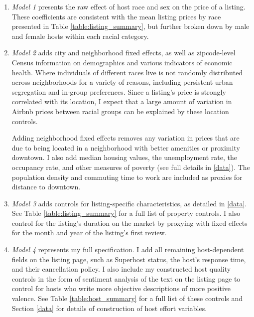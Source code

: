 \begin{enumerate}
	\item \textit{Model 1} presents the raw effect of host race and sex on the price of a listing. These coefficients are consistent with the mean listing prices by race presented in Table \ref{table:listing_summary}, but further broken down by male and female hosts within each racial category.
	
	\item \textit{Model 2} adds city and neighborhood fixed effects, as well as zipcode-level Census information on demographics and various indicators of economic health. Where individuals of different races live is not randomly distributed across neighborhoods for a variety of reasons, including persistent urban segregation  and in-group preferences. Since a listing's price is strongly correlated with its location, I expect that a large amount of variation in Airbnb prices between racial groups can be explained by these location controls. 
	
	Adding neighborhood fixed effects removes any variation in prices that are due to being located in a neighborhood with better amenities or proximity downtown. I also add median housing values, the unemployment rate, the occupancy rate, and other measures of poverty (see full details in \ref{data}). The population density and commuting time to work are included as proxies for distance to downtown. 
		
	\item \textit{Model 3} adds controls for listing-specific characteristics, as detailed in \ref{data}. See Table \ref{table:listing_summary} for a full list of property controls. I also control for the listing's duration on the market by proxying with fixed effects for the month and year of the listing's first review.
	
	\item \textit{Model 4} represents my full specification. I add all remaining host-dependent fields on the listing page, such as Superhost status, the host's response time, and their cancellation policy. I also include my constructed host quality controls in the form of sentiment analysis of the text on the listing page to control for hosts who write more objective descriptions of more positive valence. See Table \ref{table:host_summary} for a full list of these controls and Section \ref{data} for details of construction of host effort variables. 
\end{enumerate}




